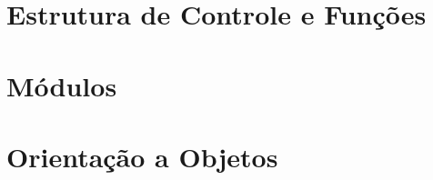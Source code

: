     \section{Estrutura de Controle e Fun\c{c}\~{o}es}



    \section{M\'{o}dulos}



    \section{Orienta\c{c}\~{a}o a Objetos}



